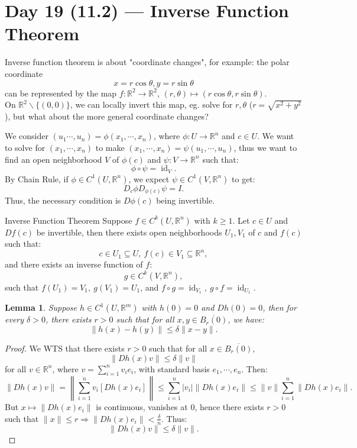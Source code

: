 \documentclass[11pt]{article}
\makeatletter
\newcounter{thmcounter}
\newenvironment{theorem}[1]{\begin{thmbox}{#1}{}}{\end{thmbox}}
\theoremstyle{quiet}
\newtheorem{lemma}[thmcounter]{Lemma}
\newtheorem{lemma}[tcb@cnt@defbox]{Lemma}
\theoremstyle{quietremark}
\makeatother
\begin{document}
\newpage
\section{Day 19 (11.2) --- Inverse Function Theorem}
Inverse function theorem is about "coordinate changes", for example: the polar coordinate
\[
x=r\cos\theta,y=r\sin\theta
\]
can be represented by the map $f:\mathbb{R}^2\to\mathbb{R}^2$, $(r,\theta)\mapsto (r\cos\theta,r\sin\theta)$. \\
On $\mathbb{R}^2\backslash\{(0,0)\}$, we can locally invert this map, eg. solve for $r,\theta$ ($r=\sqrt{x^2+y^2}$), but what about the more general coordinate changes?

We consider $(u_1\cdots,u_n)=\phi(x_1,\cdots,x_n)$, where $\phi:U\to\mathbb{R}^n$ and $c\in U$. We want to solve for $(x_1,\cdots,x_n)$ to make $(x_1,\cdots,x_n)=\psi(u_1,\cdots,u_n)$, thus we want to find an open neighborhood $V$ of $\phi(c)$ and $\psi:V\to\mathbb{R}^n$ such that:
\[
\phi\circ\psi=\operatorname{id}_V.
\]
By Chain Rule, if $\phi\in C^1(U,\mathbb{R}^n)$, we expect $\psi\in C^1(V,\mathbb{R}^n)$ to get:
\[
D_c\phi D_{\phi(c)}\psi=I.
\]
Thus, the necessary condition is $D\phi (c)$ being invertible.

\begin{theorem}{Inverse Function Theorem}
Suppose $f\in C^k(U,\mathbb{R}^n)$ with $k\ge 1$. Let $c\in U$ and $Df(c)$ be invertible, then there exists open neighborhoods $U_1,V_1$ of $c$ and $f(c)$ such that:
\[
c\in U_1\subseteq U, ~f(c)\in V_1\subseteq\mathbb{R}^n,
\]
and there exists an inverse function of $f$: 
\[
g\in C^k(V,\mathbb{R}^n),
\]
such that $f(U_1)=V_1, ~g(V_1)=U_1$, and $f\circ g=\operatorname{id}_{V_1}, ~g\circ f=\operatorname{id}_{U_1}$.
\end{theorem}

\begin{lemma}
Suppose $h\in C^1(U,\mathbb{R}^m)$ with $h(0)=0$ and $Dh(0)=0$, then for every $\delta>0$, there exists $r>0$ such that for all $x,y\in \overline {B_r(0)}$, we have:
\[
\|h(x)-h(y)\|\le \delta\|x-y\|.
\]
\end{lemma}

\begin{proof}
We WTS that there exists $r>0$ such that for all $x\in \overline{B_r(0)}$, 
\[
\|Dh(x)v\|\le\delta\|v\|
\]
for all $v\in\mathbb{R}^n$, where $\displaystyle v=\sum_{i=1}^nv_ie_i$, with standard basis $e_1,\cdots,e_n$. Then:
\[
\|Dh(x)v\|=\left\|\sum_{i=1}^n v_i [Dh(x)e_i]\right\|\le\sum_{i=1}^n|v_i|\|Dh(x)e_i\|\le\|v\|\sum_{i=1}^n\|Dh(x)e_i\|.
\]
But $x\mapsto \|Dh(x)e_i\|$ is continuous, vanishes at 0, hence there exists $r>0$ such that $\displaystyle\|x\|\le r\Rightarrow \|Dh(x)e_i\|<\frac{\delta}{n}$. Thus:
\[
\|Dh(x)v\|\le \delta\|v\|.
\]
\end{proof}
\end{document}
